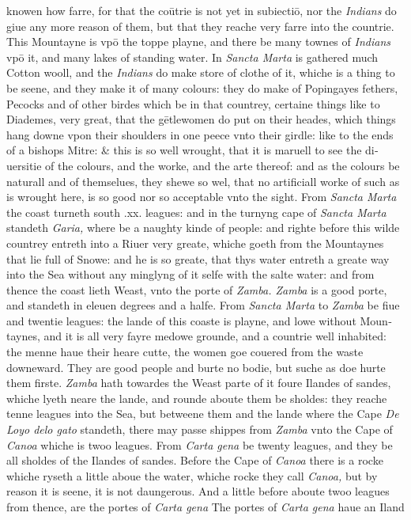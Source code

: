 \documentclass[11pt,twoside]{article}\makeatletter
\begin{document}
	\normalmarginpar
       knowen how farre, for that the coūtrie is not yet in subiectiō, nor the {\itshape Indians} do giue any more reason of them, but that they reache very farre into the countrie. This Mountayne is vpō the toppe playne, and there be many townes of {\itshape Indians} vpō it, and many lakes of standing water. In {\itshape Sancta Marta} is ga­thered much Cotton wooll, and the {\itshape Indians} do make store of clothe of it, whiche is a thing to be seene, and they make it of many colours: they do make of Popingayes fethers, Pecocks and of other birdes which be in that countrey, certaine things like to Diademes, very great, that the gētlewomen do put on their heades, which things hang downe vpon their shoulders in one peece vnto their girdle: like to the ends of a bishops Mi­tre: \& this is so well wrought, that it is maruell to see the di­uersitie of the colours, and the worke, and the arte thereof: and as the colours be naturall and of themselues, they shewe so wel, that no artificiall worke of such as is wrought here, is so good nor so acceptable vnto the sight. From {\itshape Sancta Marta} the coast turneth south .xx. leagues: and in the turnyng cape %
 of {\itshape Sancta Marta} standeth {\itshape Garia,} where be a naughty kinde of people: and righte before this wilde countrey entreth in­to 
	\normalmarginpar
       a Riuer very greate, whiche goeth from the Mountaynes that lie full of Snowe: and he is so greate, that thys wa­ter entreth a greate way into the Sea without any min­glyng of it selfe with the salte water: and from thence the coast lieth Weast, vnto the porte of {\itshape Zamba. Zamba} is a good porte, and standeth in eleuen degrees and a halfe. From {\itshape Sancta Marta} to {\itshape Zamba} be fiue and twentie leagues: the lande of this coaste is playne, and lowe without Moun­taynes, and it is all very fayre medowe grounde, and a countrie well inhabited: the menne haue their heare cutte, the women goe couered from the waste downeward. They are good people and burte no bodie, but suche as doe hurte them firste. {\itshape Zamba} hath towardes the Weast parte of it foure I­landes of sandes, whiche lyeth neare the lande, and rounde aboute them be sholdes: they reache tenne leagues into the 
	\normalmarginpar
       Sea, but betweene them and the lande where the Cape {\itshape De Loyo delo gato} standeth, there may passe shippes from {\itshape Zam­ba} vnto the Cape of {\itshape Canoa} whiche is twoo leagues. From {\itshape Carta gena} be twenty leagues, and they be all sholdes of the Ilandes of sandes. Before the Cape of {\itshape Canoa} there is a rocke whiche ryseth a little aboue the water, whiche rocke they call {\itshape Canoa,} but by reason it is seene, it is not daungerous. And a little before aboute twoo leagues from thence, are the portes of {\itshape Carta gena} The portes of {\itshape Carta gena} haue an Iland 
\end{document}
